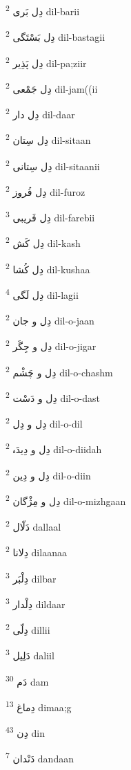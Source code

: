 \documentclass[12pt]{article}
\begin{document}
\begin{RTL}
\begin{multicols}{5}
{\ur دِل بَری}   \textsuperscript{2} dil-barii

{\ur دِل بَسْتَگی}   \textsuperscript{2} dil-bastagii

{\ur دِل پَذِیر}   \textsuperscript{2} dil-pa;ziir

{\ur دِل جَمْعی}   \textsuperscript{2} dil-jam((ii

{\ur دِل دار}   \textsuperscript{2} dil-daar

{\ur دِل سِتان}   \textsuperscript{2} dil-sitaan

{\ur دِل سِتانی}   \textsuperscript{2} dil-sitaanii

{\ur دِل فُروز}   \textsuperscript{2} dil-furoz

{\ur دِل فَریبی}   \textsuperscript{3} dil-farebii

{\ur دِل کَش}   \textsuperscript{2} dil-kash

{\ur دِل کُشا}   \textsuperscript{2} dil-kushaa

{\ur دِل لَگی}   \textsuperscript{4} dil-lagii

{\ur دِل و جان}   \textsuperscript{2} dil-o-jaan

{\ur دِل و جِگَر}   \textsuperscript{2} dil-o-jigar

{\ur دِل و چَشْم}   \textsuperscript{2} dil-o-chashm

{\ur دِل و دَسْت}   \textsuperscript{2} dil-o-dast

{\ur دِل و دِل}   \textsuperscript{2} dil-o-dil

{\ur دِل و دِیدَہ}   \textsuperscript{2} dil-o-diidah

{\ur دِل و دِین}   \textsuperscript{2} dil-o-diin

{\ur دِل و مِژْگان}   \textsuperscript{2} dil-o-mizhgaan

{\ur دَلّال}   \textsuperscript{2} dallaal

{\ur دِلانا}   \textsuperscript{2} dilaanaa

{\ur دِلْبَر}   \textsuperscript{3} dilbar

{\ur دِلْدار}   \textsuperscript{3} dildaar

{\ur دِلّی}   \textsuperscript{2} dillii

{\ur دَلِیل}   \textsuperscript{3} daliil

{\ur دَم}   \textsuperscript{30} dam

{\ur دِماغ}   \textsuperscript{13} dimaa;g

{\ur دِن}   \textsuperscript{43} din

{\ur دَنْدان}   \textsuperscript{7} dandaan


\end{multicols}
\end{RTL}
\end{document}
